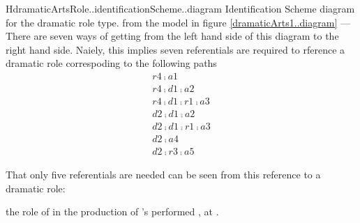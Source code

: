 \begin{erboxedFigure}{H}{dramaticArtsRole..identificationScheme..diagram}
{Identification Scheme diagram for the dramatic role type.
from the model in figure \ref{dramaticArts1..diagram} ---
There are seven ways of getting from the left hand side of this diagram to the right hand side. Naiely, this implies seven referentials are required to rference a dramatic role correspoding to the following paths
\begin{displaymath}
\begin{array}{l}
r4 \comp a1 \\
r4 \comp d1 \comp a2 \\
r4 \comp d1 \comp r1 \comp a3 \\
d2 \comp d1 \comp a2 \\
d2 \comp d1 \comp r1 \comp a3 \\
d2 \comp a4 \\
d2 \comp r3 \comp a5
\end{array}
\end{displaymath}
} %
\begin{equation*}

\end{equation*}
\end{erboxedFigure}
That only five referentials are needed can be seen from this reference to a dramatic role:
\begin{erquote}
\parbox{9.0cm}{the role of  in the production of \mbox{'s}  performed \mbox{,} at .
}
\end{erquote}

